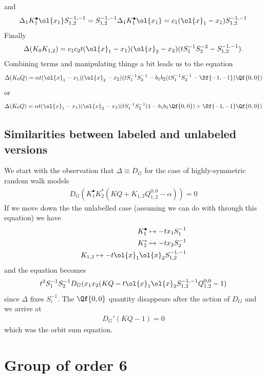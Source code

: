 and
\begin{align}
	\Delta_1 K_1^\bullet \ol{x_1}S_{1,2}^{-1,-1} = S_{1,2}^{-1,-1}\Delta_1 K_1^\bullet \ol{x_1} = c_1 (\ol{x}_1-x_1)S_{1,2}^{-1,-1}
\end{align}
Finally
\begin{align}
	\Delta(K_0 K_{1,2}) = c_1c_2t(\ol{x}_1-x_1)(\ol{x}_2-x_2)(t S_1^{-1} S_2^{-2}-S_{1,2}^{-1,-1}).
\end{align}
Combining terms and manipulating things a bit leads us to the equation
\begin{align}
	\Delta(K_0 Q) = \alpha t(\ol{x}_1-x_1)(\ol{x}_2-x_2)(tS_1^{-1}S_2^{-1} - b_1b_2(tS_1^{-1}S_2^{-1}-\Sf{-1,-1})\Qf{0,0})
\end{align}
or
\begin{align}
	\Delta(K_0 Q) = \alpha t(\ol{x}_1-x_1)(\ol{x}_2-x_2)(tS_1^{-1}S_2^{-1}(1 - b_1b_2\Qf{0,0}) + \Sf{-1,-1}\Qf{0,0})
\end{align}

\subsection{Similarities between labeled and unlabeled versions}

We start with the observation that $\Delta \equiv D_G$ for the case of highly-symmetric random walk models
\begin{align}
	D_G(K_1^\bullet K_2^\ast(KQ + K_{1,2}Q_{1,2}^{0,0} - \alpha)) = 0
\end{align}
If we move down the the unlabelled case (assuming we can do with through this equation) we have
\begin{align}
	K_1^\bullet \mapsto - t x_1 S_1^{-1}\\
	K_2^\ast \mapsto - t x_2 S_2^{-1}\\
	K_{1,2} \mapsto - t \ol{x}_1\ol{x}_2 S_{1,2}^{-1,-1}
\end{align}
and the equation becomes
\begin{align}
	t^2S_1^{-1}S_2^{-1}D_G(x_1x_2(KQ -t \ol{x}_1\ol{x}_2S_{1,2}^{-1,-1}Q_{1,2}^{0,0}-1)
\end{align}
since $\Delta$ fixes $S_i^{-1}$. The $\Qf{0,0}$ quantity disappears after the action of $D_G$ and we arrive at
\begin{align}
	D_G'(KQ-1) = 0
\end{align}
which was the orbit sum equation.
\section{Group of order 6}

